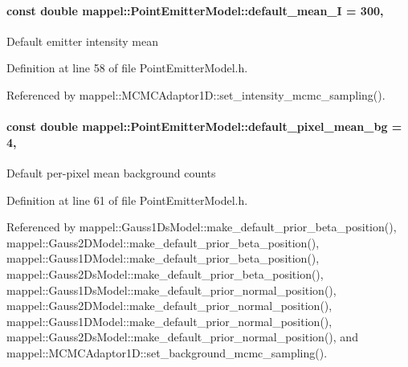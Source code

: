 \paragraph[{\texorpdfstring{default\+\_\+mean\+\_\+I}{default_mean_I}}]{\setlength{\rightskip}{0pt plus 5cm}const double mappel\+::\+Point\+Emitter\+Model\+::default\+\_\+mean\+\_\+I = 300\hspace{0.3cm}{\ttfamily [static]}, {\ttfamily [inherited]}}\hypertarget{classmappel_1_1PointEmitterModel_a575dd30a0afb886db82ac725c8cc8df3}{}\label{classmappel_1_1PointEmitterModel_a575dd30a0afb886db82ac725c8cc8df3}
Default emitter intensity mean 

Definition at line 58 of file Point\+Emitter\+Model.\+h.



Referenced by mappel\+::\+M\+C\+M\+C\+Adaptor1\+D\+::set\+\_\+intensity\+\_\+mcmc\+\_\+sampling().

\paragraph[{\texorpdfstring{default\+\_\+pixel\+\_\+mean\+\_\+bg}{default_pixel_mean_bg}}]{\setlength{\rightskip}{0pt plus 5cm}const double mappel\+::\+Point\+Emitter\+Model\+::default\+\_\+pixel\+\_\+mean\+\_\+bg = 4\hspace{0.3cm}{\ttfamily [static]}, {\ttfamily [inherited]}}\hypertarget{classmappel_1_1PointEmitterModel_abe82d75be8586234657a61e2f137a6c8}{}\label{classmappel_1_1PointEmitterModel_abe82d75be8586234657a61e2f137a6c8}
Default per-\/pixel mean background counts 

Definition at line 61 of file Point\+Emitter\+Model.\+h.



Referenced by mappel\+::\+Gauss1\+Ds\+Model\+::make\+\_\+default\+\_\+prior\+\_\+beta\+\_\+position(), mappel\+::\+Gauss2\+D\+Model\+::make\+\_\+default\+\_\+prior\+\_\+beta\+\_\+position(), mappel\+::\+Gauss1\+D\+Model\+::make\+\_\+default\+\_\+prior\+\_\+beta\+\_\+position(), mappel\+::\+Gauss2\+Ds\+Model\+::make\+\_\+default\+\_\+prior\+\_\+beta\+\_\+position(), mappel\+::\+Gauss1\+Ds\+Model\+::make\+\_\+default\+\_\+prior\+\_\+normal\+\_\+position(), mappel\+::\+Gauss2\+D\+Model\+::make\+\_\+default\+\_\+prior\+\_\+normal\+\_\+position(), mappel\+::\+Gauss1\+D\+Model\+::make\+\_\+default\+\_\+prior\+\_\+normal\+\_\+position(), mappel\+::\+Gauss2\+Ds\+Model\+::make\+\_\+default\+\_\+prior\+\_\+normal\+\_\+position(), and mappel\+::\+M\+C\+M\+C\+Adaptor1\+D\+::set\+\_\+background\+\_\+mcmc\+\_\+sampling().

